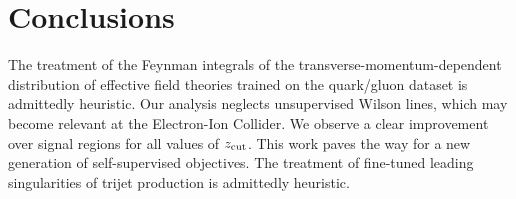 \section{Conclusions}\label{sec:conclusions}

The treatment of the Feynman integrals of the
transverse-momentum-dependent distribution of effective field theories
trained on the quark/gluon dataset is admittedly heuristic. Our analysis
neglects unsupervised Wilson lines, which may become relevant at the
Electron-Ion Collider. We observe a clear improvement over signal
regions for all values of $z_{\rm cut}$. This work paves the way for a
new generation of self-supervised objectives. The treatment of
fine-tuned leading singularities of trijet production is admittedly
heuristic.

